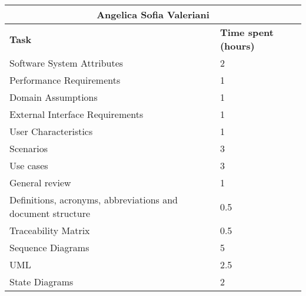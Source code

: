 \begin{table}[ht]
  \center
  \begin{tabular}{l|l}
    \multicolumn{2}{c}{\textbf{Angelica Sofia Valeriani}} \\
    \hline
    \textbf{Task} & \textbf{Time spent (hours)}\\
    \hline
    Software System Attributes & 2 \\
    Performance Requirements & 1 \\
    Domain Assumptions & 1 \\
    External Interface Requirements & 1 \\
    User Characteristics & 1 \\
    Scenarios & 3 \\
    Use cases & 3 \\
    General review & 1 \\
    Definitions, acronyms, abbreviations and document structure & 0.5 \\
    Traceability Matrix & 0.5 \\
    Sequence Diagrams & 5 \\
    UML & 2.5 \\
    State Diagrams & 2 \\
  \end{tabular}
\end{table}